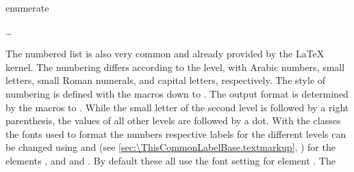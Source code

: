   \begin{Declaration}
    \begin{Environment}{enumerate}
      \begin{Body}
         \dots
        \BodyDots
      \end{Body}
    \end{Environment}
  \end{Declaration}%
  The numbered
  list is also very common and already provided by the
  {\LaTeX} kernel. The numbering differs according to the
  level, with Arabic numbers, small letters, small Roman numerals, and capital
  letters, respectively. The style of numbering is defined with the macros
   down to . The output format is determined
  by the macros  to . While the small
  letter of the second level is followed by a right parenthesis, the values of
  all other levels are followed by a dot.
  With the \KOMAScript{} classes the
  fonts used to format the numbers
  respective labels for the different levels can be changed using
   and
   (see
  \autoref{sec:\ThisCommonLabelBase.textmarkup},
  ) for the elements
  ,
   and
   and
  . By default
  these all use the font setting for element
  . The
